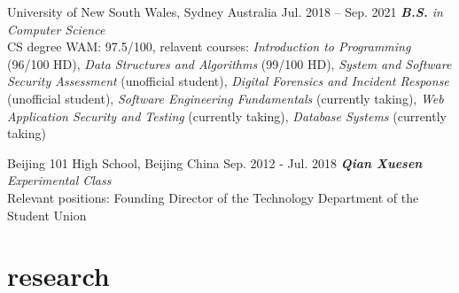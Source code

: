 \documentclass[hidelinks__VERSION__]{adamyi-cv}
\begin{document}
\begin{entrylist}


\entry
{University of New South Wales, Sydney Australia}
{Jul. 2018 -- Sep. 2021}
{\emph{\textbf{B.S.} in Computer Science}\\
CS degree WAM: 97.5/100, relavent courses: \emph{Introduction to Programming} (96/100 HD), \emph{Data Structures and Algorithms} (99/100 HD), \emph{System and Software Security Assessment} (unofficial student), \emph{Digital Forensics and Incident Response} (unofficial student), \emph{Software Engineering Fundamentals} (currently taking), \emph{Web Application Security and Testing} (currently taking), \emph{Database Systems} (currently taking)
}

\entry
{Beijing 101 High School, Beijing China}
{Sep. 2012 - Jul. 2018}
{\emph{\textbf{Qian Xuesen} Experimental Class}\\
Relevant positions: Founding Director of the Technology Department of the Student Union
}

\end{entrylist}


\section{research}
\end{document}
